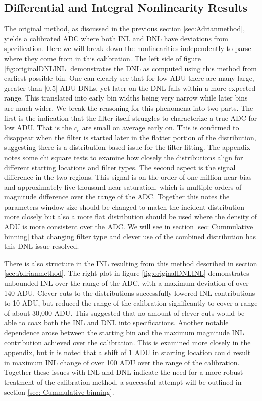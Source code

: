 \documentclass[11pt, letterpaper]{article}
\begin{document}
\subsection{Differential and Integral Nonlinearity Results}
\label{sec:DNLINLIssues}
\indent


The original method, as discussed in the previous section \ref{sec:Adrianmethod}, yields a calibrated ADC where both INL and DNL have deviations from specification. 
Here we will break down the nonlinearities independently to parse where they come from in this calibration. 
The left side of figure \ref{fig:originalDNLINL} demonstrates the DNL as computed using this method from earliest possible bin. 
One can clearly see that for low ADU there are many large, greater than $|0.5|$ ADU DNLs, yet later on the DNL falls within a more expected range. 
This translated into early bin widths being very narrow while later bins are much wider. 
We break the reasoning for this phenomena into two parts. 
The first is the indication that the filter itself struggles to characterize a true ADC for low ADU.
That is the $c_{e}$ are small on average early on. 
This is confirmed to disappear when the filter is started later in the flatter portion of the distribution, suggesting there is a distribution based issue for the filter fitting. 
The appendix notes some chi square tests to examine how closely the distributions align for different starting locations and filter types. 
The second aspect is the signal difference in the two regions. 
This signal is on the order of one million near bias and approximately five thousand near saturation, which is multiple orders of magnitude difference over the range of the ADC.
Together this notes the parameters window size should be changed to match the incident distribution more closely but also a more flat distribution should be used where the density of ADU is more consistent over the ADC.
We will see in section \ref{sec: Cummulative binning} that changing filter type and clever use of the combined distribution has this DNL issue resolved. 
\indent 


There is also structure in the INL resulting from this method described in section \ref{sec:Adrianmethod}.
The right plot in figure \ref{fig:originalDNLINL} demonstrates unbounded INL over the range of the ADC, with a maximum deviation of over 140 ADU. 
Clever cuts to the distributions successfully lowered INL contributions to 10 ADU, but reduced the range of the calibration significantly to cover a range of about 30,000 ADU. 
This suggested that no amount of clever cuts would be able to coax both the INL and DNL into specifications. 
Another notable dependence arose between the starting bin and the maximum magnitude INL contribution achieved over the calibration. 
This is examined more closely in the appendix, but it is noted that a shift of 1 ADU in starting location could result in maximum INL change of over 100 ADU over the range of the calibration. 
Together these issues with INL and DNL indicate the need for a more robust treatment of the calibration method, a successful attempt will be outlined in section \ref{sec: Cummulative binning}.
\end{document}
